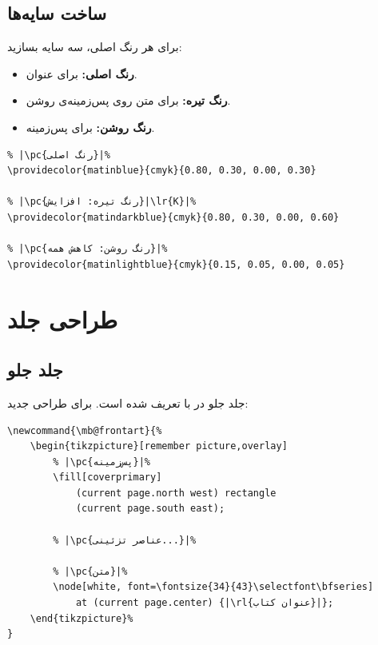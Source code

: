 
\subsection{ساخت سایه‌ها}
\label{sec:custom-theme-shades}

برای هر رنگ اصلی، سه سایه بسازید:

\begin{itemize}
    \item \textbf{رنگ اصلی:} برای عنوان.
    \item \textbf{رنگ تیره:} برای متن روی
    پس‌زمینه‌ی روشن.
    \item \textbf{رنگ روشن:} برای پس‌زمینه.
\end{itemize}

\begin{latin}
\begin{verbatim}
% |\pc{رنگ اصلی}|%
\providecolor{matinblue}{cmyk}{0.80, 0.30, 0.00, 0.30}

% |\pc{رنگ تیره: افزایش}|\lr{K}|%
\providecolor{matindarkblue}{cmyk}{0.80, 0.30, 0.00, 0.60}

% |\pc{رنگ روشن: کاهش همه}|%
\providecolor{matinlightblue}{cmyk}{0.15, 0.05, 0.00, 0.05}
\end{verbatim}
\end{latin}


\section{طراحی جلد}
\label{sec:custom-theme-cover}

\subsection{جلد جلو}
\label{sec:custom-theme-front}

جلد جلو در  با
 تعریف شده است. برای
طراحی جدید:

\begin{latin}
\begin{verbatim}
\newcommand{\mb@frontart}{%
    \begin{tikzpicture}[remember picture,overlay]
        % |\pc{پس‌زمینه}|%
        \fill[coverprimary]
            (current page.north west) rectangle
            (current page.south east);

        % |\pc{عناصر تزئینی...}|%

        % |\pc{متن}|%
        \node[white, font=\fontsize{34}{43}\selectfont\bfseries]
            at (current page.center) {|\rl{عنوان کتاب}|};
    \end{tikzpicture}%
}
\end{verbatim}
\end{latin}

